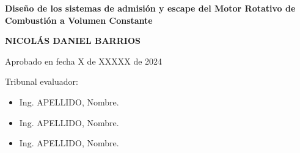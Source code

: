 \pagebreak
\begin{center}

\Large\textbf{{Diseño de los sistemas de admisión y escape del Motor Rotativo
    de Combustión a Volumen Constante \\}}

\vspace{3cm}

\large{\textbf{ NICOLÁS DANIEL BARRIOS }}\\
\vspace{3cm}
\end{center}

Aprobado en fecha X de XXXXX de 2024

\vspace{2cm}

Tribunal evaluador:

\begin{itemize}

\item Ing. APELLIDO, Nombre. %
\item Ing. APELLIDO, Nombre. %
\item Ing. APELLIDO, Nombre. %
\end{itemize}
